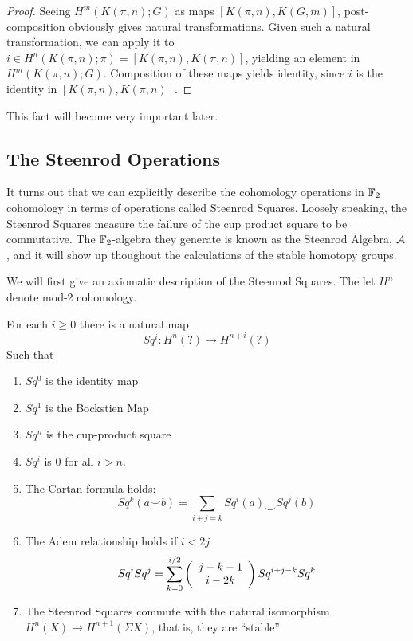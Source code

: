 \begin{proof}
  Seeing $H^m(K(\pi,n);G)$ as maps $[K(\pi,n),K(G,m)]$, post-composition obviously gives natural transformations.  Given such a natural transformation, we can apply it to $i\in H^n(K(\pi,n);\pi)=[K(\pi,n),K(\pi,n)]$, yielding an element in $H^m(K(\pi,n);G)$.  Composition of these maps yields identity, since $i$ is the identity in $[K(\pi,n),K(\pi,n)]$.  
\end{proof}

This fact will become very important later.  


\subsection{The Steenrod Operations}

\label{sec:SteenrodCohom}

It turns out that we can explicitly describe the cohomology operations in $\mathbb{F}_2$ cohomology in terms of operations called Steenrod Squares.  
Loosely speaking, the Steenrod Squares measure the failure of the cup product square to be commutative.  
The $\mathbb{F}_2$-algebra they generate is known as the Steenrod Algebra, $\mathcal{A}$, and it will show up thoughout the calculations of the stable homotopy groups.  

We will first give an axiomatic description of the Steenrod Squares.
The let $H^n$ denote mod-2 cohomology.  

\begin{Theorem}
  For each $i\ge 0$ there is a natural map
  \[Sq^i:H^n(?)\to H^{n+i}(?)\]
  Such that
  \begin{enumerate}
    \item $Sq^0$ is the identity map
    \item $Sq^1$ is the Bockstien Map
    \item $Sq^n$ is the cup-product square
    \item $Sq^i$ is 0 for all $i>n$.  
    \item The Cartan formula holds:
      \[Sq^k(a\smile b)=\sum_{i+j=k}Sq^i(a)\smile Sq^j(b)\]
    \item The Adem relationship holds if $i<2j$
      \[Sq^iSq^j=\sum_{k=0}^{i/2}\left(\begin{array}{c}j-k-1\\i-2k\end{array}\right)Sq^{i+j-k}Sq^k\]
    \item The Steenrod Squares commute with the natural isomorphism $H^n(X)\to H^{n+1}(\Sigma X)$, that is, they are ``stable''
  \end{enumerate}
\end{Theorem}


